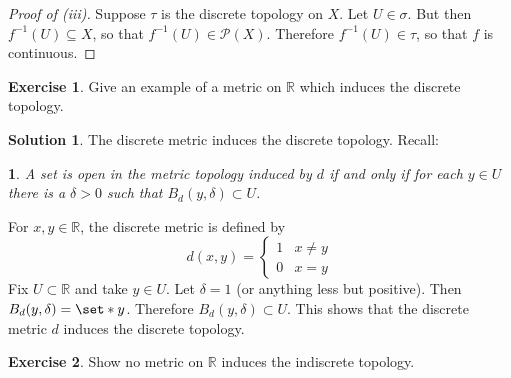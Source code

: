 \documentclass[11pt]{article}
\numberwithin{equation}{section}
\theoremstyle{plain}
\newtheorem{claim}{\color{ForestGreen}{\textbf{Claim}}}[section]
\theoremstyle{definition}
\newtheorem*{solution}{\color{Goldenrod}Solution}
\newtheorem{exercise}{\color{YellowOrange}Exercise}[section]
\newcommand\inv[1]{#1^{-1}}
\def\Set{\set*}%
\def\ss{\subset}
\def\sse{\subseteq}
\newcommand{\1}{\mathbbm 1}
\def\d{\delta}
\def\t{\tau}
\newcommand{\RR}{\mathbb R}
\newcommand{\pP}{\mathcal P}
\begin{document}
\begin{proof}[Proof of (iii)]
	Suppose $\t$ is the discrete topology on $X$. Let $U \in \sigma$. But then $\inv{f}(U) \sse X$, so that $\inv{f}(U) \in \pP(X)$. Therefore $\inv{f}(U) \in \t$, so that $f$ is continuous. 
\end{proof}

\begin{exercise}
	Give an example of a metric on $\RR$ which induces the discrete topology. 
\end{exercise}
\begin{solution}
	The discrete metric induces the discrete topology. Recall:
	\begin{claim}
		A set is open in the metric topology induced by $d$ if and only if for each $y \in U$ there is a $\d > 0$ such that $B_d(y, \d) \ss U$.
	\end{claim}
	For $x,y \in \RR$, the discrete metric is defined by
	\begin{equation}
		d(x,y) = 
		\begin{cases}
			1 & x \neq y \\
			0 & x = y
		\end{cases}
	\end{equation}
	Fix $U \ss \RR$ and take $y \in U$. Let $\d = 1$ (or anything less but positive). Then $B_d(y,\d) = \Set{y}$. Therefore $B_d(y,\d) \ss U$. This shows that the discrete metric $d$ induces the discrete topology. 
\end{solution}


\begin{exercise}
	Show no metric on $\RR$ induces the indiscrete topology.
\end{exercise}
\end{document}

